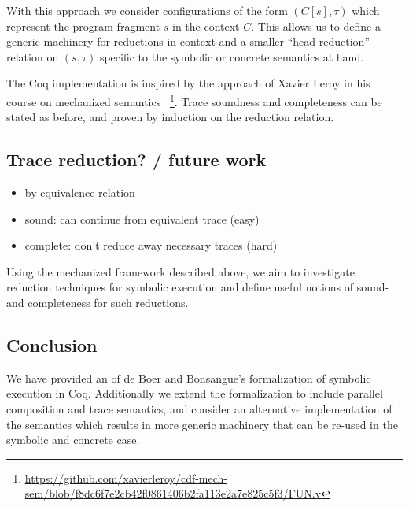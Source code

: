 \documentclass[submission,copyright,creativecommons]{eptcs}
\newcommand{\note}[1]{\color{WildStrawberry}{#1}\color{black}}
\begin{document}
With this approach we consider configurations of the form $(C[s], \tau)$ which represent the program fragment
$s$ in the context $C$. This allows us to define a generic machinery for reductions in context and a smaller
``head reduction'' relation on $(s, \tau)$ specific to the symbolic or concrete semantics at hand.
\note{examples?}

The Coq implementation is inspired by the approach of Xavier Leroy in his course on mechanized semantics~
\footnote{\url{https://github.com/xavierleroy/cdf-mech-sem/blob/f8dc6f7e2cb42f0861406b2fa113e2a7e825c5f3/FUN.v}}.
Trace soundness and completeness can be stated as before, and proven by induction on the reduction relation.

\subsection*{Trace reduction? / future work}
\begin{itemize}
  \item by equivalence relation
  \item sound: can continue from equivalent trace (easy)
  \item complete: don't reduce away necessary traces (hard)
\end{itemize}

Using the mechanized framework described above, we aim to investigate reduction techniques for symbolic
execution and define useful notions of sound- and completeness for such reductions.

\subsection*{Conclusion}
We have provided an of de Boer and Bonsangue's formalization of symbolic execution in Coq.
Additionally we extend the formalization to include parallel composition and trace semantics,
and consider an alternative implementation of the semantics which results in more generic machinery
that can be re-used in the symbolic and concrete case.



\end{document}
